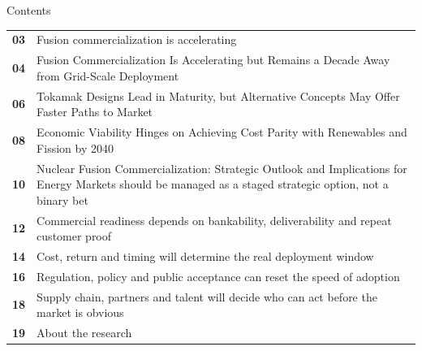 \documentclass[10pt,a4paper]{article}
\begin{document}
\clearpage
{\sffamily\fontsize{26}{31}\selectfont\color{BONavy} Contents}\par\vspace{10pt}
\begin{tabularx}{\linewidth}{p{14mm}Y}
\textcolor{BOGreen}{\bfseries 03} & Fusion commercialization is accelerating \\[5pt]
\textcolor{BOGreen}{\bfseries 04} & Fusion Commercialization Is Accelerating but Remains a Decade Away from Grid-Scale Deployment \\[5pt]
\textcolor{BOGreen}{\bfseries 06} & Tokamak Designs Lead in Maturity, but Alternative Concepts May Offer Faster Paths to Market \\[5pt]
\textcolor{BOGreen}{\bfseries 08} & Economic Viability Hinges on Achieving Cost Parity with Renewables and Fission by 2040 \\[5pt]
\textcolor{BOGreen}{\bfseries 10} & Nuclear Fusion Commercialization: Strategic Outlook and Implications for Energy Markets should be managed as a staged strategic option, not a binary bet \\[5pt]
\textcolor{BOGreen}{\bfseries 12} & Commercial readiness depends on bankability, deliverability and repeat customer proof \\[5pt]
\textcolor{BOGreen}{\bfseries 14} & Cost, return and timing will determine the real deployment window \\[5pt]
\textcolor{BOGreen}{\bfseries 16} & Regulation, policy and public acceptance can reset the speed of adoption \\[5pt]
\textcolor{BOGreen}{\bfseries 18} & Supply chain, partners and talent will decide who can act before the market is obvious \\[5pt]
\textcolor{BOGreen}{\bfseries 19} & About the research \\[5pt]
\end{tabularx}
\clearpage
\end{document}
